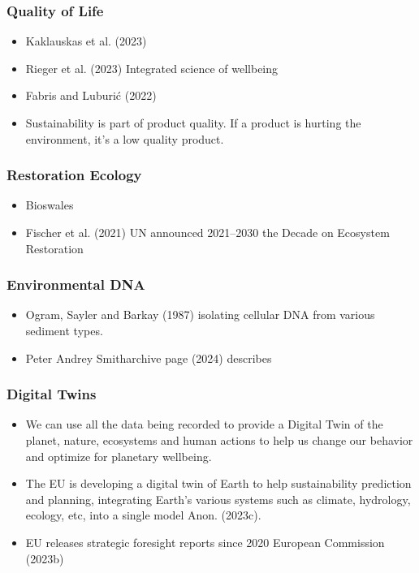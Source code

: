 \documentclass[
  letterpaper,
  DIV=11,
  numbers=noendperiod]{scrartcl}
\begin{document}
\subsubsection{Quality of Life}\label{quality-of-life}

\begin{itemize}
\item
  Kaklauskas et al. (2023)
\item
  Rieger et al. (2023) Integrated science of wellbeing
\item
  Fabris and Luburić (2022)
\item
  Sustainability is part of product quality. If a product is hurting the
  environment, it's a low quality product.
\end{itemize}

\subsubsection{Restoration Ecology}\label{restoration-ecology}

\begin{itemize}
\item
  Bioswales
\item
  Fischer et al. (2021) UN announced 2021--2030 the Decade on Ecosystem
  Restoration
\end{itemize}

\subsubsection{\texorpdfstring{\textbf{Environmental
DNA}}{Environmental DNA}}\label{environmental-dna}

\begin{itemize}
\item
  Ogram, Sayler and Barkay (1987) isolating cellular DNA from various
  sediment types.
\item
  Peter Andrey Smitharchive page (2024) describes
\end{itemize}

\subsubsection{Digital Twins}\label{digital-twins}

\begin{itemize}
\item
  We can use all the data being recorded to provide a Digital Twin of
  the planet, nature, ecosystems and human actions to help us change our
  behavior and optimize for planetary wellbeing.
\item
  The EU is developing a digital twin of Earth to help sustainability
  prediction and planning, integrating Earth's various systems such as
  climate, hydrology, ecology, etc, into a single model Anon. (2023c).
\item
  EU releases strategic foresight reports since 2020 European Commission
  (2023b)
\end{itemize}
\end{document}
